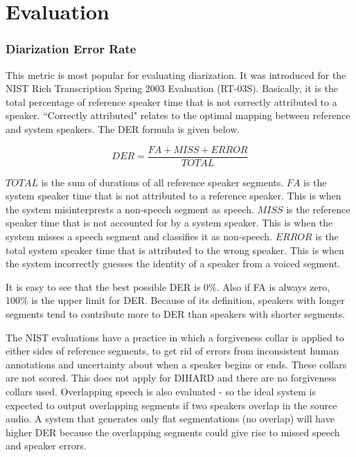
\section{Evaluation}

	\subsubsection{Diarization Error Rate}
		This metric is most popular for evaluating diarization. It was introduced for the NIST Rich Transcription Spring 2003 Evaluation (RT-03S). Basically, it is the total percentage of reference speaker time that is not correctly attributed to a speaker. ``Correctly attributed" relates to the optimal mapping between reference and system speakers. The DER formula is given below.
		
		$$ DER = \frac{FA + MISS + ERROR}{TOTAL} $$
		
		$TOTAL$ is the sum of durations of all reference speaker segments.
		$FA$ is the system speaker time that is not attributed to a reference speaker. This is when the system misinterprests a non-speech segment as speech.
		$MISS$ is the reference speaker time that is not accounted for by a system speaker. This is when the system misses a speech segment and classifies it as non-speech.
		$ERROR$ is the total system speaker time that is attributed to the wrong speaker. This is when the system incorrectly guesses the identity of a speaker from a voiced segment.
		
		It is easy to see that the best possible DER is 0\%. Also if FA is always zero, 100\% is the upper limit for DER. Because of its definition, speakers with longer segments tend to contribute more to DER than speakers with shorter segments.
		
		The NIST evaluations have a practice in which a forgiveness collar is applied to either sides of reference segments, to get rid of errors from inconsistent human annotations and uncertainty about when a speaker begins or ends. These collars are not scored. This does not apply for DIHARD and there are no forgiveness collars used. Overlapping speech is also evaluated - so the ideal system is expected to output overlapping segments if two speakers overlap in the source audio. A system that generates only flat segmentations (no overlap) will have higher DER because the overlapping segments could give rise to missed speech and speaker errors.


